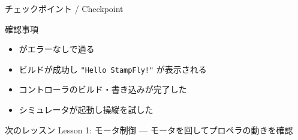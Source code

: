 \begin{frame}{チェックポイント / Checkpoint}
  \begin{alertblock}{確認事項}
    \begin{itemize}
      \item[$\square$]  がエラーなしで通る
      \item[$\square$] ビルドが成功し \texttt{"Hello StampFly!"} が表示される
      \item[$\square$] コントローラのビルド・書き込みが完了した
      \item[$\square$] シミュレータが起動し操縦を試した
    \end{itemize}
  \end{alertblock}

  \vspace{1em}

  \begin{block}{次のレッスン}
    Lesson 1: モータ制御 --- モータを回してプロペラの動きを確認
  \end{block}
\end{frame}

